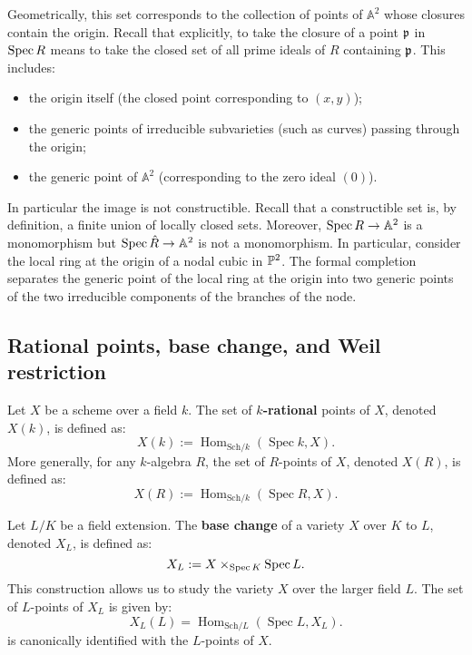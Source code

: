 \documentclass[12pt]{article}
\begin{document}
\begin{example}
    Geometrically, this set corresponds to the collection of points of \( \mathbb{A}^2 \) whose closures contain the origin. Recall that explicitly, to take the closure of a point $\mf p$ in $\Spec R$ means to take the closed set of all prime ideals of $R$ containing $\mf p$. 
    This includes:
    \begin{itemize}
        \item the origin itself (the closed point corresponding to \( (x, y) \));
        \item the generic points of irreducible subvarieties (such as curves) passing through the origin;
        \item the generic point of \( \mathbb{A}^2 \) (corresponding to the zero ideal \( (0) \)).
    \end{itemize}
    In particular the image is not constructible. Recall that a constructible set is, by definition, a finite union of locally closed sets. Moreover, $\Spec R \to \A^2$ is a monomorphism but $\Spec \hat R \to \A^2$ is not a monomorphism. In particular, consider the local ring at the origin of a nodal cubic in $\P^2$. The formal completion separates the generic point of the local ring at the origin into two generic points of the two irreducible components of the branches of the node.
\end{example}

\subsection{Rational points, base change, and Weil restriction}
\begin{definition}
    Let $X$ be a scheme over a field $k$. The set of \textbf{$k$-rational }points of $X$, denoted $X(k)$, is defined as:
    \[
    X(k) := \operatorname{Hom}_{\text{Sch}/k}(\operatorname{Spec} k, X).
    \]
    More generally, for any $k$-algebra $R$, the set of $R$-points of $X$, denoted $X(R)$, is defined as:
    \[
    X(R) := \operatorname{Hom}_{\text{Sch}/k}(\operatorname{Spec} R, X).
    \]
\end{definition}

\begin{definition}
    Let \( L/K \) be a field extension. The \textbf{base change} of a variety \( X \) over \( K \) to \( L \), denoted \( X_L \), is defined as:
    \[
    X_L := X \times_{\Spec K} \Spec L.
    \]
    This construction allows us to study the variety \( X \) over the larger field \( L \).
    The set of \( L \)-points of \( X_L \) is given by:
    \[
    X_L(L) = \operatorname{Hom}_{\text{Sch}/L}(\operatorname{Spec} L, X_L).
    \] is canonically identified with the $L$-points of $X$.
\end{definition}
\end{document}
